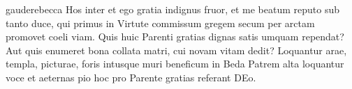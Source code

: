 \documentclass{ees}
\begin{document}
{\begin{movement}{gauderebecca}
  \voice[Levita]
  Hos inter et ego gratia indignus fruor,
  et me beatum reputo sub tanto duce,
  qui primus in Virtute commissum gregem
  secum per arctam promovet coeli viam.
  Quis huic Parenti gratias dignas satis umquam rependat?
  Aut quis enumeret bona collata matri,
  cui novam vitam dedit?
  Loquantur arae, templa, picturae,
  foris intusque muri beneficum
  in Beda Patrem alta loquantur voce
  et aeternas pio hoc pro Parente gratias referant DEo.
\end{movement}





}

\eesScore
\end{document}
